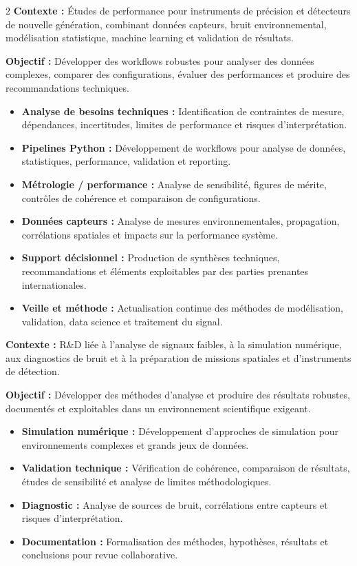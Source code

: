 \documentclass[8pt,a4paper,ragged2e,withhyper]{altacv}
\begin{document}
\begin{paracol}{2}
\textbf{Contexte :} Études de performance pour instruments de précision et détecteurs de nouvelle génération, combinant données capteurs, bruit environnemental, modélisation statistique, machine learning et validation de résultats.

\textbf{Objectif :} Développer des workflows robustes pour analyser des données complexes, comparer des configurations, évaluer des performances et produire des recommandations techniques.

\begin{itemize}
  \item \textbf{Analyse de besoins techniques :} Identification de contraintes de mesure, dépendances, incertitudes, limites de performance et risques d’interprétation.
  \item \textbf{Pipelines Python :} Développement de workflows pour analyse de données, statistiques, performance, validation et reporting.
  \item \textbf{Métrologie / performance :} Analyse de sensibilité, figures de mérite, contrôles de cohérence et comparaison de configurations.
  \item \textbf{Données capteurs :} Analyse de mesures environnementales, propagation, corrélations spatiales et impacts sur la performance système.
  \item \textbf{Support décisionnel :} Production de synthèses techniques, recommandations et éléments exploitables par des parties prenantes internationales.
  \item \textbf{Veille et méthode :} Actualisation continue des méthodes de modélisation, validation, data science et traitement du signal.
\end{itemize}

\divider


\textbf{Contexte :} R\&D liée à l’analyse de signaux faibles, à la simulation numérique, aux diagnostics de bruit et à la préparation de missions spatiales et d’instruments de détection.

\textbf{Objectif :} Développer des méthodes d’analyse et produire des résultats robustes, documentés et exploitables dans un environnement scientifique exigeant.

\begin{itemize}
  \item \textbf{Simulation numérique :} Développement d’approches de simulation pour environnements complexes et grands jeux de données.
  \item \textbf{Validation technique :} Vérification de cohérence, comparaison de résultats, études de sensibilité et analyse de limites méthodologiques.
  \item \textbf{Diagnostic :} Analyse de sources de bruit, corrélations entre capteurs et risques d’interprétation.
  \item \textbf{Documentation :} Formalisation des méthodes, hypothèses, résultats et conclusions pour revue collaborative.
\end{itemize}


\end{paracol}
\end{document}
